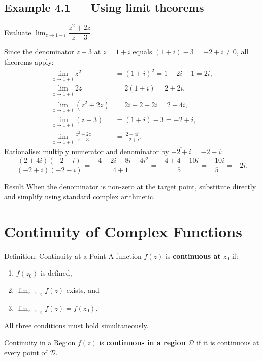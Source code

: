 \documentclass[12pt,a4paper]{article}
\begin{document}
\subsection*{Example 4.1 --- Using limit theorems}

Evaluate $\lim_{z \to 1+i} \dfrac{z^2 + 2z}{z - 3}$.

Since the denominator $z - 3$ at $z = 1+i$ equals $(1+i) - 3 = -2 + i \neq 0$,
all theorems apply:
\begin{align*}
  \lim_{z \to 1+i} z^2 &= (1+i)^2 = 1 + 2i - 1 = 2i, \\
  \lim_{z \to 1+i} 2z  &= 2(1+i) = 2 + 2i, \\
  \lim_{z \to 1+i}(z^2 + 2z) &= 2i + 2 + 2i = 2 + 4i, \\
  \lim_{z \to 1+i}(z - 3) &= (1+i) - 3 = -2 + i, \\
  \lim_{z \to 1+i}\frac{z^2+2z}{z-3} &= \frac{2+4i}{-2+i}.
\end{align*}
Rationalise: multiply numerator and denominator by $\overline{-2+i} = -2-i$:
\[
  \frac{(2+4i)(-2-i)}{(-2+i)(-2-i)}
  = \frac{-4-2i-8i-4i^2}{4+1}
  = \frac{-4+4 - 10i}{5}
  = \frac{-10i}{5} = -2i.
\]

\begin{learnbox}{Result}
When the denominator is non-zero at the target point, substitute directly
and simplify using standard complex arithmetic.
\end{learnbox}

\section{Continuity of Complex Functions}

\begin{infobox}{Definition: Continuity at a Point}
A function $f(z)$ is \textbf{continuous at $z_0$} if:
\begin{enumerate}[nosep,label=(\roman*)]
  \item $f(z_0)$ is defined,
  \item $\lim_{z \to z_0} f(z)$ exists, and
  \item $\lim_{z \to z_0} f(z) = f(z_0)$.
\end{enumerate}
All three conditions must hold simultaneously.
\end{infobox}

\begin{infobox}{Continuity in a Region}
$f(z)$ is \textbf{continuous in a region} $\mathcal{D}$ if it is continuous
at every point of $\mathcal{D}$.
\end{infobox}
\end{document}
